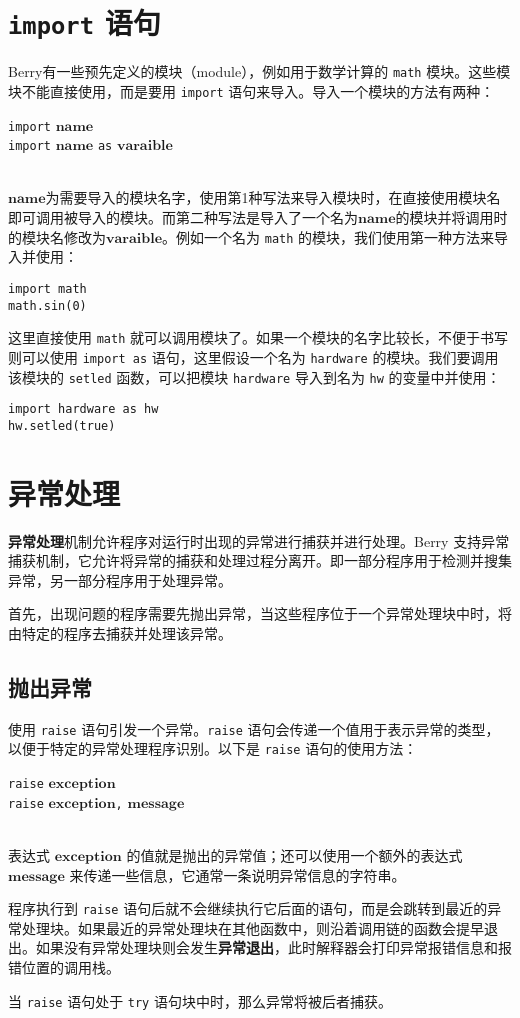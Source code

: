 \section{\texttt{import} 语句}

Berry有一些预先定义的模块（module），例如用于数学计算的 \texttt{math} 模块。这些模块不能直接使用，而是要用 \texttt{import} 语句来导入。导入一个模块的方法有两种：
\begin{algorithm}
    \texttt{import} $\bm{name}$ \\
    \texttt{import} $\bm{name}$ \texttt{as} $\bm{varaible}$
\end{algorithm}\vspace{-0.6em}\\
$\bm{name}$为需要导入的模块名字，使用第1种写法来导入模块时，在直接使用模块名即可调用被导入的模块。而第二种写法是导入了一个名为$\bm{name}$的模块并将调用时的模块名修改为$\bm{varaible}$。例如一个名为 \texttt{math} 的模块，我们使用第一种方法来导入并使用：
\begin{lstlisting}[language=berry, numbers=none]
import math
math.sin(0)
\end{lstlisting}
这里直接使用 \texttt{math} 就可以调用模块了。如果一个模块的名字比较长，不便于书写则可以使用 \texttt{import as} 语句，这里假设一个名为 \texttt{hardware} 的模块。我们要调用该模块的 \texttt{setled} 函数，可以把模块 \texttt{hardware} 导入到名为 \texttt{hw} 的变量中并使用：
\begin{lstlisting}[language=berry, numbers=none]
import hardware as hw
hw.setled(true)
\end{lstlisting}

\section{异常处理}

\textbf{异常处理}机制允许程序对运行时出现的异常进行捕获并进行处理。Berry 支持异常捕获机制，它允许将异常的捕获和处理过程分离开。即一部分程序用于检测并搜集异常，另一部分程序用于处理异常。

首先，出现问题的程序需要先抛出异常，当这些程序位于一个异常处理块中时，将由特定的程序去捕获并处理该异常。

\subsection{抛出异常}

使用 \texttt{raise} 语句引发一个异常。\texttt{raise} 语句会传递一个值用于表示异常的类型，以便于特定的异常处理程序识别。以下是 \texttt{raise} 语句的使用方法：
\begin{algorithm}
    \texttt{raise} $\bm{exception}$ \\
    \texttt{raise} $\bm{exception}$\texttt{,}  $\bm{message}$
\end{algorithm}\vspace{-0.6em}\\
表达式 $\bm{exception}$ 的值就是抛出的异常值；还可以使用一个额外的表达式 $\bm{message}$ 来传递一些信息，它通常一条说明异常信息的字符串。

程序执行到 \texttt{raise} 语句后就不会继续执行它后面的语句，而是会跳转到最近的异常处理块。如果最近的异常处理块在其他函数中，则沿着调用链的函数会提早退出。如果没有异常处理块则会发生\textbf{异常退出}，此时解释器会打印异常报错信息和报错位置的调用栈。

当 \texttt{raise} 语句处于 \texttt{try} 语句块中时，那么异常将被后者捕获。
